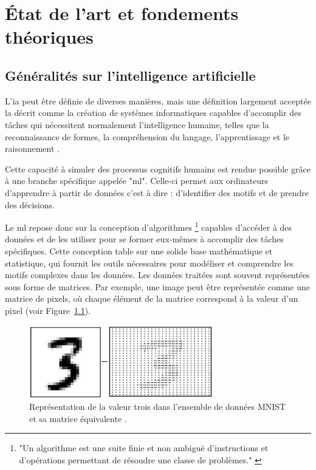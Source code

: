 
\chapter{État de l'art et fondements théoriques} %

\label{ch:1} %

\section{Généralités sur l'intelligence artificielle}

L'\acf{ia} peut être définie de diverses manières, mais une définition largement acceptée la décrit comme la création de systèmes informatiques capables d'accomplir des tâches qui nécessitent normalement l'intelligence humaine, telles que la reconnaissance de formes, la compréhension du langage, l'apprentissage et le raisonnement \cite{Goodfellow-et-al-2016, Caelen_Blete_2023}.

Cette capacité à simuler des processus cognitifs humains est rendue possible grâce à une branche spécifique appelée "\acf{ml}". Celle-ci permet aux ordinateurs d'apprendre à partir de données c'est à dire : d'identifier des motifs et de prendre des décisions. 

Le \acs{ml} repose donc sur la conception d'algorithmes \footnote{"Un algorithme est une suite finie et non ambiguë d'instructions et d’opérations permettant de résoudre une classe de problèmes." \cite{frwiki:213207404}} capables d'accéder à des données et de les utiliser pour se former eux-mêmes à accomplir des tâches spécifiques. Cette conception table sur une solide base mathématique et statistique, qui fournit les outils nécessaires pour modéliser et comprendre les motifs complexes dans les données. Les données traitées sont souvent représentées sous forme de matrices. Par exemple, une image peut être représentée comme une matrice de pixels, où chaque élément de la matrice correspond à la valeur d'un pixel (voir Figure~\ref{fig:mnist-image-matrix}). 

\begin{figure}[H]
    \centering
    \includegraphics[width=8cm]{gfx/fig-mnist-image-matrix.png}
    \caption{Représentation de la valeur trois dans l'ensemble de données MNIST et sa matrice équivalente \cite{mnist}.}
    \label{fig:mnist-image-matrix}
\end{figure}

